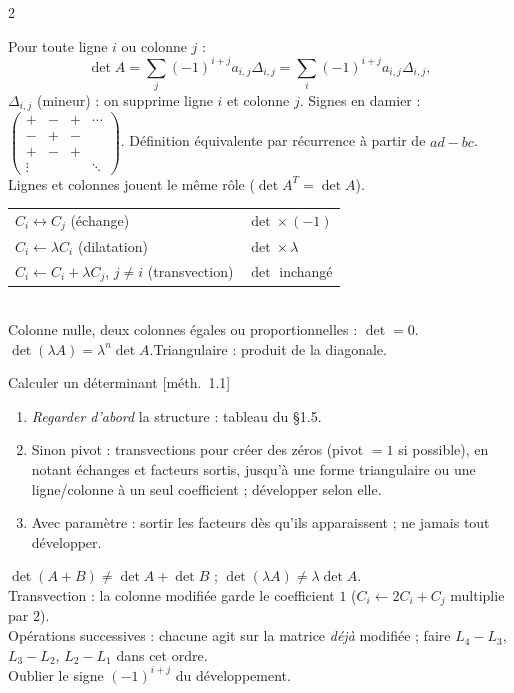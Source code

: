 \documentclass[a4paper,10pt]{article}
\newcommand{\livre}[1]{{\sffamily\scriptsize\color{Gris}[#1]}}
\begin{document}
\begin{multicols}{2}
\begin{PROP}[DÉVELOPPEMENT \livre{th.~1.4}]
Pour toute ligne $i$ ou colonne $j$ :
\[\det A=\sum_j(-1)^{i+j}a_{i,j}\Delta_{i,j}=\sum_i(-1)^{i+j}a_{i,j}\Delta_{i,j},\]
$\Delta_{i,j}$ (mineur) : on supprime ligne $i$ et colonne $j$. Signes en damier :
$\left(\begin{smallmatrix}+&-&+&\cdots\\-&+&-&\\+&-&+&\\\vdots&&&\ddots\end{smallmatrix}\right)$.
Définition équivalente par récurrence à partir de $ad-bc$. Lignes et colonnes jouent le même rôle ($\det A^T=\det A$).
\end{PROP}

\begin{PROP}
\begin{tabular}{@{}ll@{}}
$C_i\leftrightarrow C_j$ (échange) & $\det\times(-1)$\\
$C_i\leftarrow\lambda C_i$ (dilatation) & $\det\times\lambda$\\
$C_i\leftarrow C_i+\lambda C_j$, $j\neq i$ (transvection) & $\det$ inchangé
\end{tabular}\\
Colonne nulle, deux colonnes égales ou proportionnelles : $\det=0$.\\
$\det(\lambda A)=\lambda^n\det A$.\quad Triangulaire : produit de la diagonale.
\end{PROP}

\begin{METH}{Calculer un déterminant \livre{méth.~1.1}}
\begin{enumerate}
\item \emph{Regarder d'abord} la structure : tableau du §1.5.
\item Sinon pivot : transvections pour créer des zéros (pivot $=1$ si possible), en notant échanges et facteurs sortis, jusqu'à
      une forme triangulaire ou une ligne/colonne à un seul coefficient ; développer selon elle.
\item Avec paramètre : sortir les facteurs dès qu'ils apparaissent ; ne jamais tout développer.
\end{enumerate}
\end{METH}

\begin{PIEGE}
$\det(A+B)\neq\det A+\det B$ ; $\det(\lambda A)\neq\lambda\det A$.\\
Transvection : la colonne modifiée garde le coefficient $1$ ($C_i\leftarrow2C_i+C_j$ multiplie par $2$).\\
Opérations successives : chacune agit sur la matrice \emph{déjà} modifiée ; faire $L_4-L_3$, $L_3-L_2$, $L_2-L_1$ dans cet ordre.\\
Oublier le signe $(-1)^{i+j}$ du développement.
\end{PIEGE}


\end{multicols}
\end{document}
